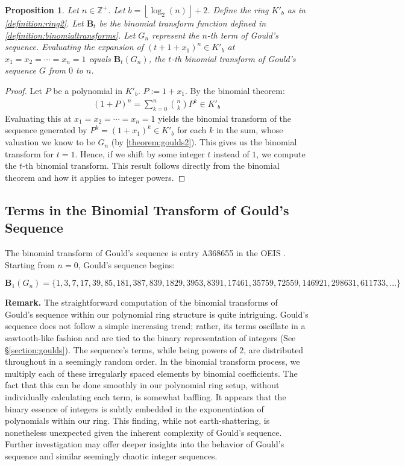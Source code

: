\documentclass{article}
\theoremstyle{plain}
\theoremstyle{definition}
\newtheorem{proposition}{Proposition}
\newcommand{\floor}[1]{\left\lfloor #1 \right\rfloor}
\newcommand{\Z}{\mathbb{Z}}
\newcommand{\K}{K}
\newcommand{\BT}{\textbf{B}}
\begin{document}
\begin{proposition} \label{proposition:gouldbinomialtransforms}
\textit{
Let $n \in \Z^+$. Let $b={\floor{\log_2(n)}+2}$. Define the ring $\K'_b$ as in \cref{definition:ring2}. Let $\BT_t$ be the binomial transform function defined in \cref{definition:binomialtransforms}. Let $G_n$ represent the $n$-th term of Gould's sequence. Evaluating the expansion of $(t + 1 + x_1)^n \in \K'_b$ at $x_1=x_2=\cdots=x_n=1$ equals $\BT_t(G_n)$, the $t$-th binomial transform of Gould's sequence $G$ from $0$ to $n$.
}
\end{proposition}
\begin{proof}
Let $P$ be a polynomial in $\K'_b$. $P := 1 + x_1$. By the binomial theorem:
\begin{align*}
    (1 + P)^n = \sum_{k=0}^{n} \binom{n}{k} P^k \in \K'_b
\end{align*}
Evaluating this at $x_1=x_2=\cdots=x_n=1$ yields the binomial transform of the sequence generated by $P^k = (1 + x_1)^k \in \K'_b$ for each $k$ in the sum, whose valuation we know to be $G_n$ (by \cref{theorem:goulds2}). This gives us the binomial transform for $t=1$. Hence, if we shift by some integer $t$ instead of $1$, we compute the $t$-th binomial transform. This result follows directly from the binomial theorem and how it applies to integer powers.
\end{proof}

\subsection{Terms in the Binomial Transform of Gould's Sequence}
The binomial transform of Gould's sequence is entry A368655 in the OEIS \cite{A368655}. Starting from $n=0$, Gould's sequence begins:

$\BT_{1}(G_n) = \{ 1, 3, 7, 17, 39, 85, 181, 387, 839, 1829, 3953, 8391, 17461, 35759, 72559, 146921, 298631, 611733, \ldots \}$

\textbf{Remark.}
The straightforward computation of the binomial transforms of Gould's sequence within our polynomial ring structure is quite intriguing. Gould's sequence does not follow a simple increasing trend; rather, its terms oscillate in a sawtooth-like fashion and are tied to the binary representation of integers (See \S\ref{section:goulds}). The sequence's terms, while being powers of $2$, are distributed throughout in a seemingly random order. In the binomial transform process, we multiply each of these irregularly spaced elements by binomial coefficients. The fact that this can be done smoothly in our polynomial ring setup, without individually calculating each term, is somewhat baffling. It appears that the binary essence of integers is subtly embedded in the exponentiation of polynomials within our ring. This finding, while not earth-shattering, is nonetheless unexpected given the inherent complexity of Gould's sequence. Further investigation may offer deeper insights into the behavior of Gould's sequence and similar seemingly chaotic integer sequences.

\begingroup
\raggedright


\endgroup
\end{document}
